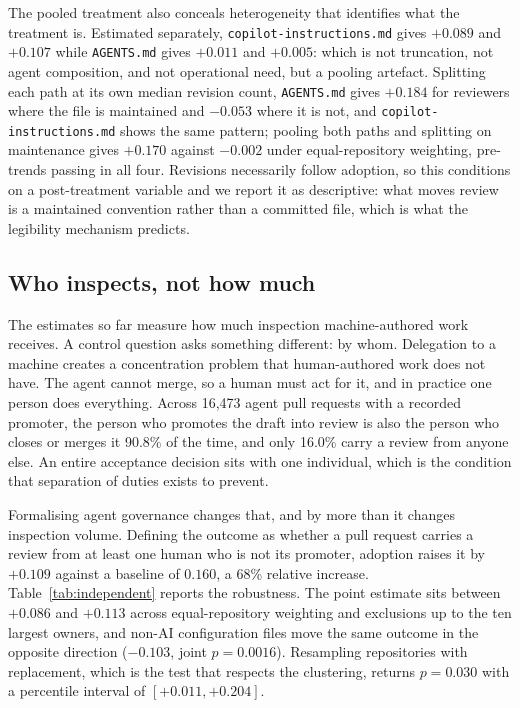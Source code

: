 \documentclass[mnsc]{informs4}
\begin{document}
The pooled treatment also conceals heterogeneity that identifies what the treatment
is. Estimated separately, \texttt{copilot-instructions.md} gives $+0.089$ and
$+0.107$ while \texttt{AGENTS.md} gives $+0.011$ and $+0.005$: which is not
truncation, not agent composition, and not operational need, but a pooling
artefact. Splitting each path at its own median revision count, \texttt{AGENTS.md}
gives $+0.184$ for reviewers where the file is maintained and $-0.053$ where it is
not, and \texttt{copilot-instructions.md} shows the same pattern; pooling both
paths and splitting on maintenance gives $+0.170$ against $-0.002$ under
equal-repository weighting, pre-trends passing in all four. Revisions necessarily
follow adoption, so this conditions on a post-treatment variable and we report it
as descriptive: what moves review is a maintained convention rather than a
committed file, which is what the legibility mechanism predicts.

\subsection{Who inspects, not how much}

The estimates so far measure how much inspection machine-authored work receives.
A control question asks something different: by whom. Delegation to a machine
creates a concentration problem that human-authored work does not have. The agent
cannot merge, so a human must act for it, and in practice one person does
everything. Across 16,473 agent pull requests with a recorded promoter, the person
who promotes the draft into review is also the person who closes or merges it
90.8\% of the time, and only 16.0\% carry a review from anyone else. An entire
acceptance decision sits with one individual, which is the condition that
separation of duties exists to prevent.

Formalising agent governance changes that, and by more than it changes inspection
volume. Defining the outcome as whether a pull request carries a review from at
least one human who is not its promoter, adoption raises it by $+0.109$ against a
baseline of $0.160$, a 68\% relative increase. Table~\ref{tab:independent} reports
the robustness. The point estimate sits between $+0.086$ and $+0.113$ across
equal-repository weighting and exclusions up to the ten largest owners, and non-AI
configuration files move the same outcome in the opposite direction ($-0.103$,
joint $p=0.0016$). Resampling repositories with replacement, which is the test
that respects the clustering, returns $p=0.030$ with a percentile interval of
$[+0.011, +0.204]$.
\end{document}
